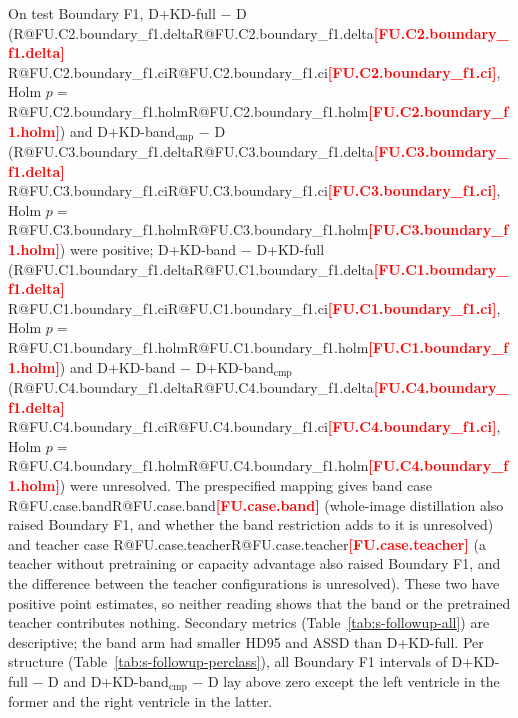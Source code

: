 \documentclass[10pt]{article}
\makeatletter
\newcommand{\R}[1]{\ifcsname R@#1\endcsname\csname R@#1\endcsname\else\textbf{\textcolor{red}{[#1]}}\fi}
\renewcommand\paragraph{\@startsection{paragraph}{4}{\z@}{1.6ex \@plus .5ex \@minus .2ex}{-1em}{\normalfont\normalsize\bfseries}}
\newcommand{\fitwidth}[1]{\sbox{\fitbox}{#1}\ifdim\wd\fitbox>\linewidth\resizebox{\linewidth}{!}{\usebox{\fitbox}}\else\usebox{\fitbox}\fi}
\makeatother
\begin{document}
\paragraph{Results.} On test Boundary F1, D+KD-full $-$ D (\R{FU.C2.boundary_f1.delta} \R{FU.C2.boundary_f1.ci}, Holm $p=$\,\R{FU.C2.boundary_f1.holm}) and D+KD-band$_{\mathrm{cmp}}$ $-$ D (\R{FU.C3.boundary_f1.delta} \R{FU.C3.boundary_f1.ci}, Holm $p=$\,\R{FU.C3.boundary_f1.holm}) were positive; D+KD-band $-$ D+KD-full (\R{FU.C1.boundary_f1.delta} \R{FU.C1.boundary_f1.ci}, Holm $p=$\,\R{FU.C1.boundary_f1.holm}) and D+KD-band $-$ D+KD-band$_{\mathrm{cmp}}$ (\R{FU.C4.boundary_f1.delta} \R{FU.C4.boundary_f1.ci}, Holm $p=$\,\R{FU.C4.boundary_f1.holm}) were unresolved. The prespecified mapping gives band case \R{FU.case.band} (whole-image distillation also raised Boundary F1, and whether the band restriction adds to it is unresolved) and teacher case \R{FU.case.teacher} (a teacher without pretraining or capacity advantage also raised Boundary F1, and the difference between the teacher configurations is unresolved). These two have positive point estimates, so neither reading shows that the band or the pretrained teacher contributes nothing. Secondary metrics (Table~\ref{tab:s-followup-all}) are descriptive; the band arm had smaller HD95 and ASSD than D+KD-full. Per structure (Table~\ref{tab:s-followup-perclass}), all Boundary F1 intervals of D+KD-full $-$ D and D+KD-band$_{\mathrm{cmp}}$ $-$ D lay above zero except the left ventricle in the former and the right ventricle in the latter.

\begin{table}[!htbp]\centering\scriptsize
\fitwidth{}
\caption{\label{tab:s-followup-all}Controls of study 5, with the replication for reference, all metrics, official ACDC patients 101--150 (secondary, exploratory). Positive $\Delta$ favours the first arm; HD95 and ASSD in pixels with sign reversed; readings against $\pm$2\,px (HD95) and $\pm$0.5\,px (ASSD) for the distances. Holm: over the four control comparisons within each metric (Boundary F1 is the prespecified family). Arm means are means of run means (between-run SD).}
\end{table}

\begin{table}[!htbp]\centering\scriptsize
\fitwidth{}
\caption{\label{tab:s-followup-perclass}Controls of study 5 per structure (descriptive, unadjusted).}
\end{table}
\end{document}
